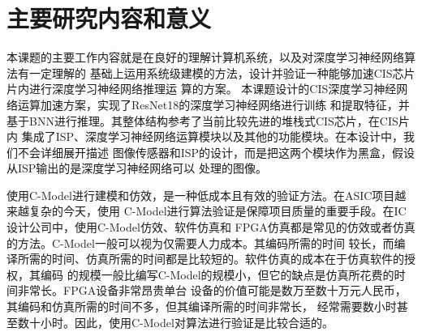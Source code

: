 \section{主要研究内容和意义}

本课题的主要工作内容就是在良好的理解计算机系统，以及对深度学习神经网络算法有一定理解的
基础上运用系统级建模的方法，设计并验证一种能够加速CIS芯片片内进行深度学习神经网络推理运
算的方案。  
本课题设计的CIS深度学习神经网络运算加速方案，实现了ResNet18的深度学习神经网络进行训练
和提取特征，并基于BNN进行推理。其整体结构参考了当前比较先进的堆栈式CIS芯片，在CIS片内
集成了ISP、深度学习神经网络运算模块以及其他的功能模块。在本设计中，我们不会详细展开描述
图像传感器和ISP的设计，而是把这两个模块作为黑盒，假设从ISP输出的是深度学习神经网络可以
处理的图像。  

使用C-Model进行建模和仿效，是一种低成本且有效的验证方法。在ASIC项目越来越复杂的今天，使用
C-Model进行算法验证是保障项目质量的重要手段。在IC设计公司中，使用C-Model仿效、软件仿真和
FPGA仿真都是常见的仿效或者仿真的方法。C-Model一般可以视为仅需要人力成本。其编码所需的时间
较长，而编译所需的时间、仿真所需的时间都是比较短的。软件仿真的成本在于仿真软件的授权，其编码
的规模一般比编写C-Model的规模小，但它的缺点是仿真所花费的时间非常长。FPGA设备非常昂贵单台
设备的价值可能是数万至数十万元人民币，其编码和仿真所需的时间不多，但其编译所需的时间非常长，
经常需要数小时甚至数十小时。因此，使用C-Model对算法进行验证是比较合适的。
